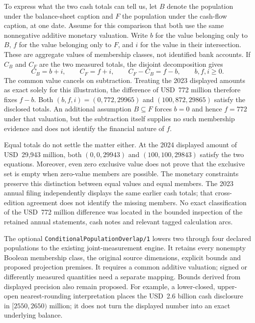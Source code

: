 To express what the two cash totals can tell us, let $B$ denote the population
under the balance-sheet caption and $F$ the population under the cash-flow
caption, at one date. Assume for this comparison that both use the same
nonnegative additive monetary valuation. Write $b$ for the value belonging
only to $B$, $f$ for the value belonging only to $F$, and $i$ for the value in
their intersection. These are aggregate values of membership classes, not
identified bank accounts. If $C_B$ and $C_F$ are the two measured totals, the
disjoint decomposition gives
\[
 C_B=b+i,\qquad C_F=f+i,\qquad C_F-C_B=f-b,
 \qquad b,f,i\geq0.
\]
The common value cancels on subtraction. Treating the 2023 displayed amounts
as exact solely for this illustration, the difference of USD~772 million
therefore fixes $f-b$. Both $(b,f,i)=(0,772,29965)$ and
$(100,872,29865)$ satisfy the disclosed totals. An additional assumption
$B\subseteq F$ forces $b=0$ and hence $f=772$ under that valuation, but the
subtraction itself supplies no such membership evidence and does not identify
the financial nature of $f$.

Equal totals do not settle the matter either. At the 2024 displayed amount
of USD~29,943 million, both $(0,0,29943)$ and $(100,100,29843)$ satisfy the
two equations. Moreover, even zero exclusive value does not prove that the
exclusive set is empty when zero-value members are possible. The monetary
constraints preserve this distinction between equal values and equal members.
The 2023 annual filing independently displays the same earlier cash totals;
that cross-edition agreement does not identify the missing members. No exact
classification of the USD~772 million difference was located in the bounded
inspection of the retained annual statements, cash notes and relevant tagged
calculation arcs.

The optional \texttt{ConditionalPopulationOverlap/1} lowers two through four
declared populations to the existing joint-measurement engine. It retains
every nonempty Boolean membership class, the original source dimensions,
explicit bounds and proposed projection premises. It requires a common
additive valuation; signed or differently measured quantities need a separate
mapping. Bounds derived from displayed precision also remain proposed. For
example, a lower-closed, upper-open nearest-rounding interpretation places
the USD~2.6 billion cash disclosure in $[2550,2650)$ million; it does not turn
the displayed number into an exact underlying balance.

